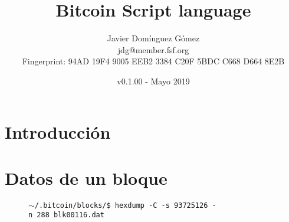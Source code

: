 \documentclass{article}
\title{\textbf{Bitcoin Script language}}
\author{Javier Domínguez Gómez \\
\small{jdg@member.fsf.org} \\
\small{Fingerprint: 94AD 19F4 9005 EEB2 3384 C20F 5BDC C668 D664 8E2B}}
\date{v0.1.00 - Mayo 2019}
\begin{document}
\maketitle

\tableofcontents{}

\vspace{19mm}

\section{Introducción}

\section{Datos de un bloque}
\begin{figure}[H]
\scriptsize{\texttt{$\sim$/.bitcoin/blocks/\$ hexdump\ -C\ -s\ 93725126\ -n\ 288\ blk00116.dat}}
    

\end{figure}
\end{document}
